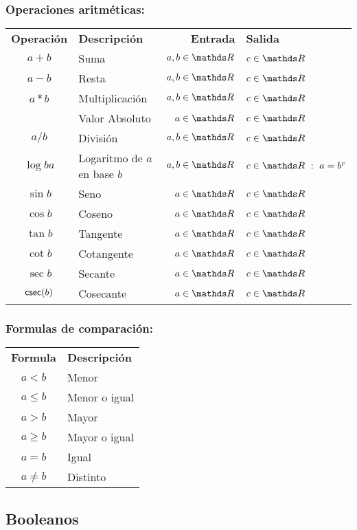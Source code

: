 \subsubsection*{Operaciones aritméticas:}
\begin{tabular}{clrl}
	\textbf{Operación} & \textbf{Descripción} & \textbf{Entrada} & \textbf{Salida} \\
	$a+b$ &  Suma & $a, b \in \float$ & $c\in\float$\\
	$a-b$ &  Resta & $a, b \in \float$ & $c\in\float$\\
	$a*b$ &  Multiplicación & $a, b \in \float$ & $c\in\float$ \\
	\abs{a} & Valor Absoluto & $a\in\float$ & $c\in\float$  \\
	$a/b$ & División & $a, b \in \float$ & $c\in\float$\\
	$\log{b}{a}$ & Logaritmo de $a$ en base $b$ & $a, b \in \float$ & $c\in\float~:~a = b^c$\\
	$\sin{b}$ & Seno & $a \in \float$ & $c\in\float$\\
	$\cos{b}$ & Coseno & $a \in \float$ & $c\in\float$\\
	$\tan{b}$ & Tangente & $a \in \float$ & $c\in\float$\\
	$\cot{b}$ & Cotangente & $a \in \float$ & $c\in\float$\\
	$\sec{b}$ & Secante & $a \in \float$ & $c\in\float$\\
	$\mathsf{csec}(b)$ & Cosecante & $a \in \float$ & $c\in\float$\\
\end{tabular}

\subsubsection*{Formulas de comparación:}
\begin{tabular}{cl}
	\textbf{Formula} & \textbf{Descripción} \\
	$a<b$ &  Menor \\
	$a\leq b$ &  Menor o igual\\
	$a > b$ &  Mayor \\
	$a \geq b$ & Mayor o igual \\
	$a = b$ & Igual\\
	$a \neq b$ & Distinto \\
\end{tabular}

\subsection{Booleanos}

